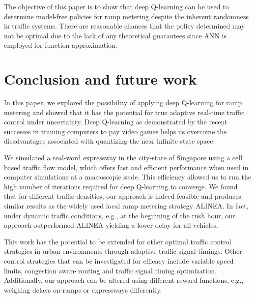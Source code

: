 \documentclass[conference]{IEEEtran}
\begin{document}
The objective of this paper is to show that deep Q-learning can be used to determine model-free policies for ramp metering despite the inherent randomness in traffic systems. There are reasonable chances that the policy determined may not be optimal due to the lack of any theoretical guarantees since \ac{ANN} is employed for function approximation. 




\section{Conclusion and future work}
\label{sec:conclusion}
In this paper, we explored the possibility of applying deep Q-learning for ramp metering and showed that it has the potential for true adaptive real-time traffic control under uncertainty. Deep Q-learning as demonstrated by the recent successes in training computers to pay video games helps us overcome the disadvantages associated with quantizing the near infinite state space. 

We simulated a real-word expressway in the city-state of Singapore using a cell based traffic flow model, which offers fast and efficient performance when used in computer simulations at a macroscopic scale.
This efficiency allowed us to run the high number of iterations required for deep Q-learning to converge.
We found that for different traffic densities, our approach is indeed feasible and produces similar results as the widely used local ramp metering strategy ALINEA. In fact, under dynamic traffic conditions, e.g., at the beginning of the rush hour, our approach outperformed ALINEA yielding a lower delay for all vehicles.

This work has the potential to be extended for other optimal traffic control strategies in urban environments through adaptive traffic signal timings.
Other control strategies that can be investigated for efficacy include variable speed limits, congestion aware routing and traffic signal timing optimization.
Additionally, our approach can be altered using different reward functions, e.g., weighing delays on-ramps or expressways differently.




\appendices
\end{document}
